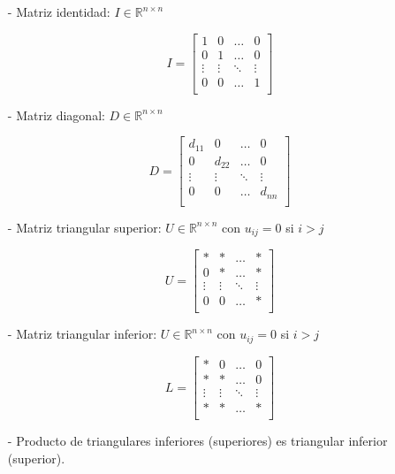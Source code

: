 \begin{itemize}
    \item[-] Matriz identidad: $I \in \mathbb{R}^{n\times n}$
    
    \[
    I = 
    \begin{bmatrix}
    1 & 0 & \ldots & 0 \\
    0 & 1 & \ldots & 0 \\
    \vdots & \vdots & \ddots & \vdots \\
    0 & 0 & \ldots & 1 \\
    \end{bmatrix}
    \]
    
    \item[-] Matriz diagonal: $D \in \mathbb{R}^{n \times n}$
    
    \[
    D = 
    \begin{bmatrix}
    d_{11} & 0 & \ldots & 0 \\
    0 & d_{22} & \ldots & 0 \\
    \vdots & \vdots & \ddots & \vdots \\
    0 & 0 & \ldots & d_{nn} \\
    \end{bmatrix}
    \]
    
    \item[-] Matriz triangular superior: $U \in \mathbb{R}^{n \times n}$ con $u_{ij} = 0$ si $i > j$
    
    \[
    U =
    \begin{bmatrix}
    * & * & \ldots & * \\
    0 & * & \ldots & * \\
    \vdots & \vdots & \ddots & \vdots \\
    0 & 0 & \ldots & * \\
    \end{bmatrix}
    \]
    
    \item[-] Matriz triangular inferior: $U \in \mathbb{R}^{n \times n}$ con $u_{ij} = 0$ si $i > j$
    
    \[
    L =
    \begin{bmatrix}
    * & 0 & \ldots & 0 \\
    * & * & \ldots & 0 \\
    \vdots & \vdots & \ddots & \vdots \\
    * & * & \ldots & * \\
    \end{bmatrix}
    \]
    
    \item[-] Producto de triangulares inferiores (superiores) es triangular inferior (superior).
\end{itemize}

